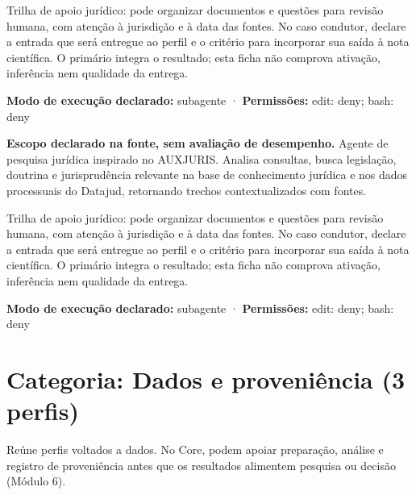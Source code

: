 \begin{funcao}
Trilha de apoio jurídico: pode organizar documentos e questões para revisão humana, com atenção à jurisdição e à data das fontes. No caso condutor, declare a entrada que será entregue ao perfil e o critério para incorporar sua saída à nota científica. O primário integra o resultado; esta ficha não comprova ativação, inferência nem qualidade da entrega.
\end{funcao}

\begin{arquitetura}
\textbf{Modo de execução declarado:} subagente · \textbf{Permissões:} edit: deny; bash: deny
\end{arquitetura}


\begin{descricao}
\textbf{Escopo declarado na fonte, sem avaliação de desempenho.}
Agente de pesquisa jurídica inspirado no AUXJURIS. Analisa consultas, busca legislação, doutrina e jurisprudência relevante na base de conhecimento jurídica e nos dados processuais do Datajud, retornando trechos contextualizados com fontes.
\end{descricao}

\begin{funcao}
Trilha de apoio jurídico: pode organizar documentos e questões para revisão humana, com atenção à jurisdição e à data das fontes. No caso condutor, declare a entrada que será entregue ao perfil e o critério para incorporar sua saída à nota científica. O primário integra o resultado; esta ficha não comprova ativação, inferência nem qualidade da entrega.
\end{funcao}

\begin{arquitetura}
\textbf{Modo de execução declarado:} subagente · \textbf{Permissões:} edit: deny; bash: deny
\end{arquitetura}

\clearpage
\section{Categoria: Dados e proveniência (3 perfis)}

\begin{descricao}
Reúne perfis voltados a dados. No Core, podem apoiar preparação, análise e registro de proveniência antes que os resultados alimentem pesquisa ou decisão (Módulo 6).
\end{descricao}

